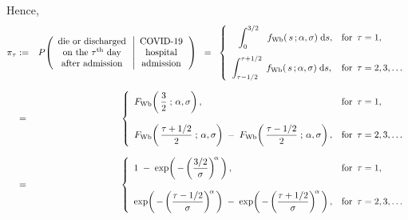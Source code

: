 Hence,
\begin{eqnarray*}
\pi_{\tau}
& := &
	P\!\left(
		\begin{array}{c}
			\textnormal{die or discharged}
			\\
			\textnormal{on the $\tau^{\textnormal{th}}$ day}
			\\
			\textnormal{after admission}
			\end{array}
		\left\vert
		\begin{array}{c}
			\textnormal{COVID-19}
			\\
			\textnormal{hospital}
			\\
			\textnormal{admission}
			\end{array}
			\right.
		\right)
\;\; = \;\;
	\left\{\begin{array}{ll}
		{\color{white}..}\displaystyle\int_{0}^{3/2}\,{\color{white}..}f_{\textnormal{Wb}}(\,s\,;\alpha,\sigma) \;\d s,
		& \textnormal{for \,$\tau = 1$},
		\\
		\overset{{\color{white}1}}{\displaystyle\int_{\tau-1/2}^{\tau+1/2}\; f_{\textnormal{Wb}}(\,s\,;\alpha,\sigma) \;\d s},
		& \textnormal{for \,$\tau = 2,3,\ldots$}
		\end{array}\right.
\\
& = &
	\overset{{\color{white}1}}{\left\{\begin{array}{ll}
		F_{\textnormal{Wb}}\!\left(\,\dfrac{3}{2}\;;\,\alpha,\sigma\right),
		& \textnormal{for \,$\tau = 1$},
		\\ \\
		F_{\textnormal{Wb}}\!\left(\,\dfrac{\tau+1/2}{2}\;;\,\alpha,\sigma\right)
		\; - \;
		F_{\textnormal{Wb}}\!\left(\,\dfrac{\tau-1/2}{2}\;;\,\alpha,\sigma\right),
		& \textnormal{for \,$\tau = 2,3,\ldots$}
		\end{array}\right.}
\\
& = &
	\overset{{\color{white}1}}{\left\{\begin{array}{ll}
		1 \; - \; \exp\!\left(\,-\left(\dfrac{3/2}{\sigma}\right)^{\!\alpha}\,\right),
		& \textnormal{for \,$\tau = 1$},
		\\ \\
		\exp\!\left(\,-\left(\dfrac{\tau-1/2}{\sigma}\right)^{\!\alpha}\,\right)
		\; - \;
		\exp\!\left(\,-\left(\dfrac{\tau+1/2}{\sigma}\right)^{\!\alpha}\,\right),
		& \textnormal{for \,$\tau = 2,3,\ldots$}
		\end{array}\right.}
\end{eqnarray*}

